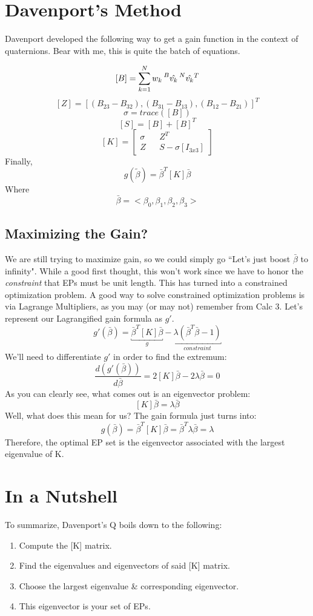 \documentclass[a4paper,14pt]{extreport}
\newcommand{\vk}[1]{\prescript{#1}{}{\hat{v_k}}}
\begin{document}
\section{Davenport's Method}
Davenport developed the following way to get a gain function in the context of quaternions. Bear with me, this is quite the batch of equations.

\[
[B] = \sum^N_{k=1} w_k\vk{B}\vk{N}^T
\]
\[
[Z] = [(B_{23}-B_{32}), (B_{31}-B_{13}), (B_{12}-B_{21})]^T
\]
\[
\sigma = trace([B])
\]
\[
[S] = [B]+[B]^T
\]
\[
[K] =
\begin{bmatrix}
\sigma && Z^T \\ Z && S-\sigma  [I_{3x3}]
\end{bmatrix}
\]
Finally,
\[
g(\tilde{\beta}) = \bar{\beta}^T[K]\bar{\beta}
\]
Where
\[\bar{\beta} = <\beta_0,\beta_1,\beta_2,\beta_3>\]
\subsection{Maximizing the Gain?}
We are still trying to maximize gain, so we could simply go ``Let's just boost $\bar{\beta}$ to infinity". While a good first thought, this won't work since we have to honor the \emph{constraint} that EPs must be unit length. This has turned into a constrained optimization problem. A good way to solve constrained optimization problems is via Lagrange Multipliers, as you may (or may not) remember from Calc 3. Let's represent our Lagrangified gain formula as $g'$.
\[
g'(\bar{\beta}) = \underbracket{\bar{\beta}^T[K]\bar{\beta}}_{g} - \underbracket{\lambda(\bar{\beta}^T\bar{\beta}-1)}_{constraint}
\]
We'll need to differentiate $g'$ in order to find the extremum:
\[
\dfrac{d(g'(\bar{\beta}))}{d\bar{\beta}} = 2[K]\bar{\beta} - 2\lambda\bar{\beta}=0
\]
As you can clearly see, what comes out is an eigenvector problem:
\[
[K]\bar{\beta}=\lambda\bar{\beta}
\]
Well, what does this mean for us? The gain formula just turns into:
\[
g(\bar{\beta}) = \bar{\beta}^T[K]\bar{\beta} = \bar{\beta}^T\lambda\bar{\beta} = \lambda
\]Therefore, the optimal EP set is the eigenvector associated with the largest eigenvalue of K.
\section{In a Nutshell}

To summarize, Davenport's Q boils down to the following:
\begin{enumerate}
\item{Compute the [K] matrix.}
\item{Find the eigenvalues and eigenvectors of said [K] matrix.}
\item{Choose the largest eigenvalue \& corresponding eigenvector.}
\item{This eigenvector is your set of EPs.}
\end{enumerate}
\end{document}
